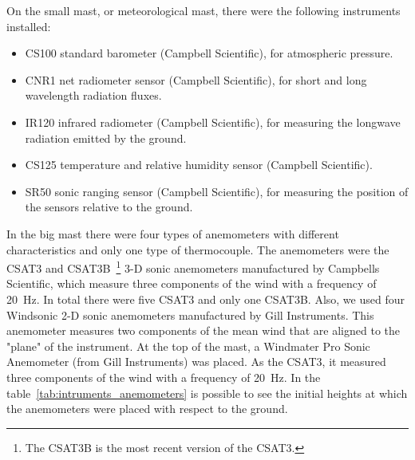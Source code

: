 On the small mast, or meteorological mast, there were the following instruments installed: 
\begin{itemize}
    \item CS100 standard barometer (Campbell Scientific), for atmospheric pressure.
    \item CNR1 net radiometer sensor (Campbell Scientific), for short and long wavelength radiation fluxes.
    \item IR120 infrared radiometer (Campbell Scientific), for measuring the longwave radiation emitted by the ground.
    \item CS125 temperature and relative humidity sensor (Campbell Scientific).
    \item SR50 sonic ranging sensor (Campbell Scientific), for measuring the position of the sensors relative to the ground.
\end{itemize}

In the big mast there were four types of anemometers with different characteristics and only one type of thermocouple. The anemometers were the CSAT3 and CSAT3B~\footnote{The CSAT3B is the most recent version of the CSAT3.} 3-D sonic anemometers manufactured by Campbells Scientific, which measure three components of the wind with a frequency of 20~Hz. In total there were five CSAT3 and only one CSAT3B. Also, we used four Windsonic 2-D sonic anemometers manufactured by Gill Instruments. This anemometer measures two components of the mean wind that are aligned to the "plane" of the instrument. At the top of the mast, a Windmater Pro Sonic Anemometer (from Gill Instruments) was placed. As the CSAT3, it measured three components of the wind with a frequency of 20~Hz. In the table~\ref{tab:intruments_anemometers} is possible to see the initial heights at which the anemometers were placed with respect to the ground. 

